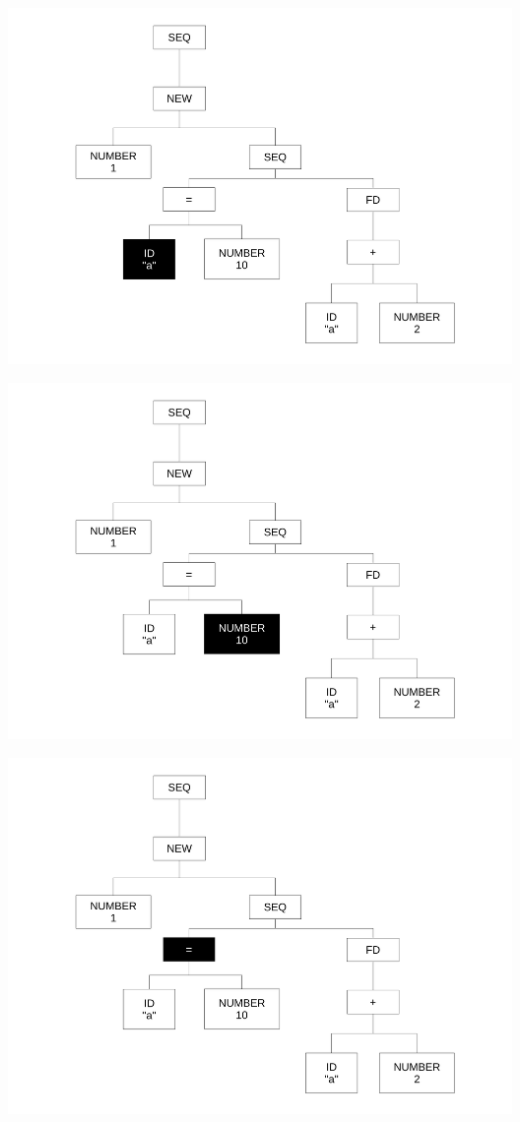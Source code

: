 \begin{frame}
\includegraphics[scale=0.3]{doc/Presentation/img/arbre6.pdf}
\end{frame}

\begin{frame}
\includegraphics[scale=0.3]{doc/Presentation/img/arbre7.pdf}
\end{frame}

\begin{frame}
\includegraphics[scale=0.3]{doc/Presentation/img/arbre5.pdf}
\end{frame}

